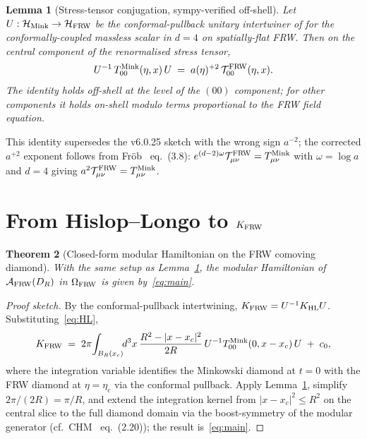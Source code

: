 \documentclass[11pt,a4paper]{article}
\newtheorem{theorem}{Theorem}
\newtheorem{lemma}[theorem]{Lemma}
\theoremstyle{remark}
\newcommand{\FRW}{{\rm FRW}}
\newcommand{\HL}{{\rm HL}}
\newcommand{\Mink}{{\rm Mink}}
\begin{document}
\begin{lemma}[Stress-tensor conjugation, sympy-verified off-shell]
\label{lem:33}
Let $U:\mathcal H_{\Mink}\to\mathcal H_{\FRW}$ be the conformal-pullback
unitary intertwiner of \cite{Frob2023} for the conformally-coupled
massless scalar in $d=4$ on spatially-flat FRW. Then on the central
component of the renormalised stress tensor,
\[
  U^{-1}\,T_{00}^{\Mink}(\eta,x)\,U
  \;=\;a(\eta)^{+2}\,\mathcal{T}_{00}^{\FRW}(\eta,x).
\]
The identity holds off-shell at the level of the
$(00)$ component; for other components it holds on-shell modulo terms
proportional to the FRW field equation.
\end{lemma}

This identity supersedes the v6.0.25 sketch with the wrong sign $a^{-2}$;
the corrected $a^{+2}$ exponent follows from Fr\"ob~\cite{Frob2023}
eq.~(3.8): $e^{(d-2)\omega}\mathcal T_{\mu\nu}^{\FRW}=T_{\mu\nu}^{\Mink}$
with $\omega=\log a$ and $d=4$ giving
$a^{2}\mathcal T_{\mu\nu}^{\FRW}=T_{\mu\nu}^{\Mink}$.

\section{From Hislop--Longo to $K_{\FRW}$}
\label{sec:HL_to_FRW}

\begin{theorem}[Closed-form modular Hamiltonian on the FRW comoving diamond]
\label{thm:main}
With the same setup as Lemma~\ref{lem:33}, the modular Hamiltonian of
$\mathcal A_{\FRW}(D_R)$ in $\Omega_{\FRW}$ is given by~\eqref{eq:main}.
\end{theorem}

\begin{proof}[Proof sketch]
By the conformal-pullback intertwining,
$K_{\FRW}=U^{-1}K_{\HL}U$. Substituting~\eqref{eq:HL},
\[
  K_{\FRW}\;=\;2\pi\!\int_{B_R(x_c)}\!\!d^{3}x\,
    \frac{R^2-|x-x_c|^2}{2R}\,U^{-1}T_{00}^{\Mink}(0,x-x_c)\,U
    \;+\;c_0,
\]
where the integration variable identifies the Minkowski diamond at
$t=0$ with the FRW diamond at $\eta=\eta_c$ via the conformal pullback.
Apply Lemma~\ref{lem:33}, simplify $2\pi/(2R)=\pi/R$, and
extend the integration kernel from $|x-x_c|^2 \le R^2$ on the central
slice to the full diamond domain via the boost-symmetry of the
modular generator (cf.~CHM~\cite{CasiniHuertaMyers2011} eq.~(2.20));
the result is~\eqref{eq:main}.
\end{proof}
\end{document}
